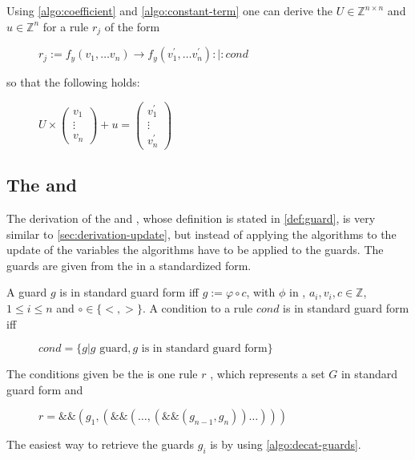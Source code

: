 Using \autoref{algo:coefficient} and \autoref{algo:constant-term} one can derive the \updatematrix $U \in \mathbb{Z}^{n\times n}$ and \updateconstants $u \in \mathbb{Z}^n$ for a rule $r_j$ of the form
\begin{figure}[H]
	\centering
	$r_j:= f_y(v_1,\dots v_n) \rightarrow f_y(v^\prime_1,\dots v^\prime_n) :|: cond$
\end{figure}  
so that the following holds:
\begin{figure}[H]
	\centering
	$U \times \begin{pmatrix} v_1 \\ \vdots \\ v_n \end{pmatrix} + u = \begin{pmatrix} v^\prime_1 \\ \vdots \\ v^\prime_n \end{pmatrix}$
\end{figure}

\subsection{The \guardmatrix and \guardconstants}
\label{sec:derivation-guard}
The derivation of the \guardmatrix and \guardconstants, whose definition is stated in \autoref{def:guard}, is very similar to \autoref{sec:derivation-update}, but instead of applying the algorithms to the update of the variables the algorithms have to be applied to the guards. The guards are given from the \seg in a standardized form.
\begin{definition}
	A guard $g$ is in standard guard form iff
		$g := \varphi \circ c$, with
	$\phi$ in \stdLinInt, $a_i,v_i,c \in \mathbb{Z}$, $1 \le i \le n$ and $\circ \in \{ <, >\}$. \newline
	A condition to a rule $cond$ is in standard guard form iff 
	\begin{figure}[H]
		\centering
		$cond = \{ g | g\text{ guard}, g\text{ is in standard guard form}\}$
	\end{figure}
\end{definition} 
The conditions given be the \seg is one rule $r$ , which represents a set $G$  in standard guard form and 
\begin{figure}[H]
	\centering
	$r = \&\&(g_1,( \&\& (\dots,(\&\&(g_{n-1},g_n) )\dots)))$
\end{figure}
The easiest way to retrieve the guards $g_i$ is by using \autoref{algo:decat-guards}.

